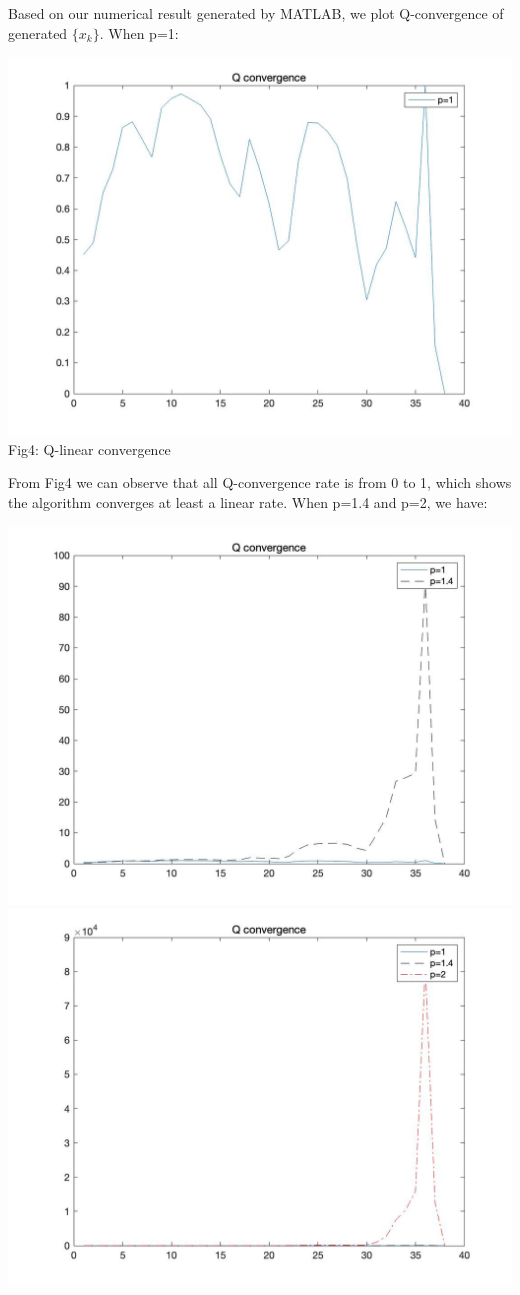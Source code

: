 \documentclass{article}
\begin{document}
\begin{spacing}{1.5}
Based on our numerical result generated by MATLAB, we plot Q-convergence of generated $\{x_k\}$. When p=1:
\begin{center}
\includegraphics[width=0.9\linewidth]{p1.jpg}\\
Fig4: Q-linear convergence 
\end{center}
From Fig4 we can observe that all Q-convergence rate is from 0 to 1, which shows the algorithm converges at least a linear rate. When p=1.4 and p=2, we have:
\begin{center}
\includegraphics[width=0.9\linewidth]{p14.jpg}\\
\includegraphics[width=0.9\linewidth]{p2.jpg}\\

\end{center}
\end{spacing}
\end{document}
